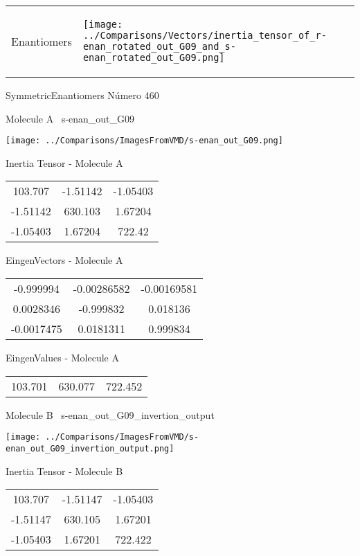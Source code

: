 \vtab[-5mm]
\begin{tabular}{*{2}{m{}}}
\begin{center}
\textcolor{NavyBlue}{\Large Enantiomers}
\end{center}
&
\begin{center}
\texttt{[image: ../Comparisons/Vectors/inertia\_tensor\_of\_r-enan\_rotated\_out\_G09\_and\_s-enan\_rotated\_out\_G09.png]}
\end{center}
\end{tabular}

 \newpage

\vtab[-3cm]
\begin{center}
{\large SymmetricEnantiomers \tab Número 460}
\end{center}
\begin{multicols}{2}
\begin{center}

Molecule A \
s-enan\_out\_G09

\texttt{[image: ../Comparisons/ImagesFromVMD/s-enan\_out\_G09.png]}

Inertia Tensor - Molecule A \\
\begin{tabular}{|c c c|}
103.707	 & 	-1.51142	 & 	-1.05403	 \\
-1.51142	 & 	630.103	 & 	1.67204	 \\
-1.05403	 & 	1.67204	 & 	722.42
\end{tabular}

\vtab
 EingenVectors - Molecule A     \\
\begin{tabular}{|c c c|}
-0.999994	 & 	-0.00286582	 & 	-0.00169581	 \\
0.0028346	 & 	-0.999832	 & 	0.018136	 \\
-0.0017475	 & 	0.0181311	 & 	0.999834
\end{tabular}

\vtab
 EingenValues - Molecule A     \\
\begin{tabular}{|c c c|}
103.701	 & 	630.077	 & 	722.452	 \\
\end{tabular}
\columnbreak

Molecule B \
s-enan\_out\_G09\_invertion\_output

\texttt{[image: ../Comparisons/ImagesFromVMD/s-enan\_out\_G09\_invertion\_output.png]}

Inertia Tensor - Molecule B \\
\begin{tabular}{|c c c|}
103.707	 & 	-1.51147	 & 	-1.05403	 \\
-1.51147	 & 	630.105	 & 	1.67201	 \\
-1.05403	 & 	1.67201	 & 	722.422
\end{tabular}


\end{center}
\end{multicols}
